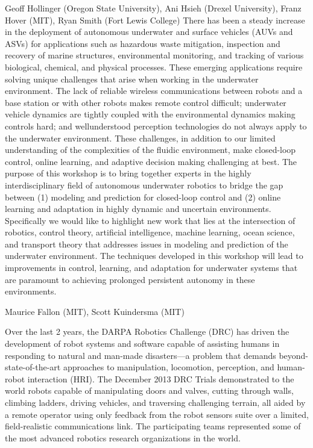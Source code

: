 \begin{spacing}{1.0}
%
{Geoff Hollinger (Oregon State University), Ani Hsieh (Drexel University), Franz Hover (MIT), Ryan Smith (Fort Lewis College)}
{
There has been a steady increase in the deployment of autonomous underwater and surface vehicles (AUVs and ASVs) for applications such as hazardous waste mitigation, inspection and recovery of marine structures, environmental monitoring, and tracking of various biological, chemical, and physical processes. These emerging applications require solving unique challenges that arise when working in the underwater environment. The lack of reliable wireless communications between robots and a base station or with other robots makes remote control difficult; underwater vehicle dynamics are tightly coupled with the environmental dynamics making controls hard; and wellunderstood perception technologies do not always apply to the underwater environment. These challenges, in addition to our limited understanding of the complexities of the fluidic environment, make closed-loop control, online learning, and adaptive decision making challenging at best. 
\clearpage
The purpose of this workshop is to bring together experts in the highly interdisciplinary field of autonomous underwater robotics to bridge the gap between (1) modeling and prediction for closed-loop control and (2) online learning and adaptation in highly dynamic and uncertain environments. Specifically we would like to highlight new work that lies at the intersection of robotics, control theory, artificial intelligence, machine learning, ocean science, and transport theory that addresses issues in modeling and prediction of the underwater environment. The techniques developed in this workshop will lead to improvements in control, learning, and adaptation for underwater systems that are paramount to achieving prolonged persistent autonomy in these environments. 
}


{Maurice Fallon (MIT), Scott Kuindersma (MIT)}
{
Over the last 2 years, the DARPA Robotics Challenge (DRC) has driven the development of robot systems and software capable of assisting humans in responding to natural and man-made disasters—a problem that demands beyond-state-of-the-art approaches to manipulation, locomotion, perception, and human-robot interaction (HRI). The December 2013 DRC Trials demonstrated to the world robots capable of manipulating doors and valves, cutting through walls, climbing ladders, driving vehicles, and traversing challenging terrain, all aided by a remote operator using only feedback from the robot sensors suite over a limited, field-realistic communications link. The participating teams represented some of the most advanced robotics research organizations in the world.

}
\end{spacing}

